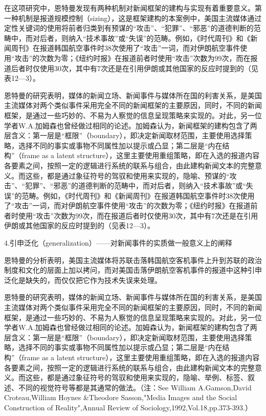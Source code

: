 \documentclass[UTF8,12pt]{ctexart}
\numberwithin{equation}{section} %
\numberwithin{figure}{section}
\numberwithin{table}{section}
\begin{document}
	在这项研究中，恩特曼发现有两种机制对新闻框架的建构与实现有着重要意义。第一种机制是报道规模控制（sizing），这是框架建构的本案例中，美国主流媒体通过定性关键词的使用将前者归类到有预谋的“攻击”、“犯罪”、“邪恶”的道德判断的范畴中，而对后者，则纳入“技术事故”或“失误”的范畴。例如，《时代周刊》和《新闻周刊》在报道韩国航空事件时38次使用了“攻击”一词，而对伊朗航空事件使用“攻击”的次数为零；《纽约时报》在报道前者时使用“攻击”次数为99次，而在报道后者时仅使用30次，其中有7次还是在引用伊朗或其他国家的反应时提到的（见表12—3）。
	
	恩特曼的研究表明，媒体的新闻立场、新闻事件与媒体所在国的利害关系，是美国主流媒体对两个类似事件采用完全不同的新闻框架的主要原因，同时，不同的新闻框架，是通过一些巧妙的、不易为人察觉的信息呈现策略来实现的。对此，另一位学者W.A.加姆森也曾经做过相同的论述。加姆森认为，新闻框架的建构包含了两层含义：第一层是“框限”（boundary），即决定新闻取材范围，主要使用选择策略，选择不同的事实或事物不同属性加以提示或凸显；第二层是“内在结构”（frame as a latent structure），这里主要使用重组策略，即在入选的报道内容各要素之间，按照一定的逻辑进行系统的联系与组合，由此建构新闻文本的完整意义。而这些，都是通过象征符号的驾驭和使用来实现的，隐喻、预谋的“攻击”、“犯罪”、“邪恶”的道德判断的范畴中，而对后者，则纳入“技术事故”或“失误”的范畴。例如，《时代周刊》和《新闻周刊》在报道韩国航空事件时38次使用了“攻击”一词，而对伊朗航空事件使用“攻击”的次数为零；《纽约时报》在报道前者时使用“攻击”次数为99次，而在报道后者时仅使用30次，其中有7次还是在引用伊朗或其他国家的反应时提到的（见表12—3）。
	
	
	
	4.引申泛化（generalization）——对新闻事件的实质做一般意义上的阐释
	
	恩特曼的分析表明，美国主流媒体将苏联击落韩国航空客机事件上升到苏联的政治制度和文化的层面上加以拷问，而对美国击落伊朗航空客机事件的报道中这种引申泛化是缺失的，而仅仅把它作为技术失误来处理。
	
	恩特曼的研究表明，媒体的新闻立场、新闻事件与媒体所在国的利害关系，是美国主流媒体对两个类似事件采用完全不同的新闻框架的主要原因，同时，不同的新闻框架，是通过一些巧妙的、不易为人察觉的信息呈现策略来实现的。对此，另一位学者W.A.加姆森也曾经做过相同的论述。加姆森认为，新闻框架的建构包含了两层含义：第一层是“框限”（boundary），即决定新闻取材范围，主要使用选择策略，选择不同的事实或事物不同属性加以提示或凸显；第二层是“内在结构”（frame as a latent structure），这里主要使用重组策略，即在入选的报道内容各要素之间，按照一定的逻辑进行系统的联系与组合，由此建构新闻文本的完整意义。而这些，都是通过象征符号的驾驭和使用来实现的，隐喻、举例、标签、叙述、不同的视觉符号等都是其通常的做法。（注：See William A.Gamson,David Croteau,William Hoynes \&Theodore Sasson,"Media Images and the Social Construction of Reality",Annual Review of Sociology,1992,Vol.18,pp.373-393.）
	
\end{document}
